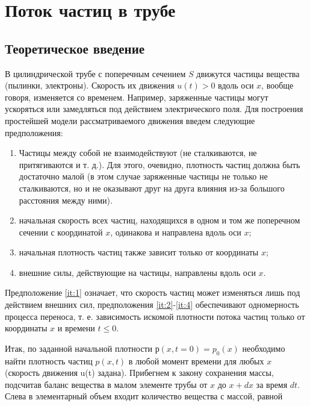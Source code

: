 \chapter{Поток частиц в трубе}

	\section{Теоретическое введение}
	
		В цилиндрической трубе с поперечным сечением $ S $ движутся частицы вещества (пылинки, электроны). 
		Скорость их движения $ u(t) > 0 $
		вдоль оси $ x $, вообще говоря, изменяется со временем.
		Например, заряженные частицы могут 
		ускоряться или замедляться под
		действием электрического поля. Для
		построения простейшей модели 
		рассматриваемого движения введем следующие предположения\cite{Samarskiy}:
		
		\begin{enumerate}
			\item \label{it:1}  Частицы между собой не взаимодействуют (не сталкиваются, не притягиваются и т. д.). Для этого, очевидно, плотность частиц должна быть достаточно малой (в этом случае заряженные частицы не только не сталкиваются, но и не оказывают друг на друга влияния из-за большого расстояния между ними).
		
			\item \label{it:2} начальная скорость всех частиц, находящихся в одном и том же поперечном сечении с координатой $ x $, одинакова и направлена вдоль оси $ x $;
		
			\item \label{it:3} начальная плотность частиц также зависит только от координаты $ x $;
		
			\item \label{it:4} внешние силы, действующие на частицы, направлены вдоль оси $ x $.
		\end{enumerate}
		
		Предположение \ref{it:1} означает, что скорость частиц может изменяться лишь под действием внешних сил, предположения \ref{it:2}-\ref{it:4} обеспечивают одномерность процесса переноса, т. е. зависимость искомой плотности потока частиц только от координаты $ x $ и времени $ t\le 0 $.
		
		Итак, по заданной начальной плотности $ р(x,t=0)= p_0(x) $  необходимо
		найти плотность частиц $ p(x,t) $ в любой момент времени для 
		любых $ x $ (скорость движения u(t) задана). 
		Прибегнем к закону сохранения массы, подсчитав баланс вещества в
		малом элементе трубы от $ x $ до $ x+dx $ за время $ dt $. 
		Слева в элементарный объем входит количество вещества с массой,
		равной
		
